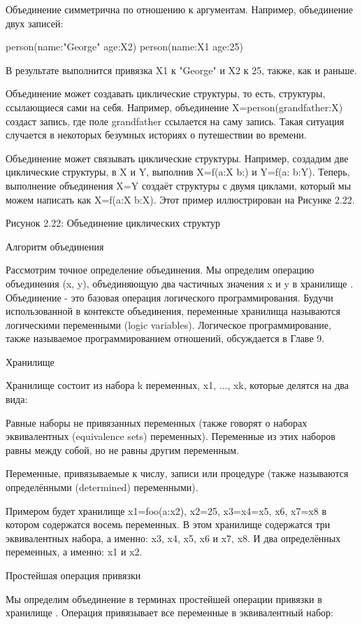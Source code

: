 Объединение симметрична по отношению к аргументам. Например, объединение двух записей:

person(name:"George" age:X2)
person(name:X1 age:25)

В результате выполнится привязка X1 к "George" и X2 к 25, также, как и раньше.

Объединение может создавать циклические структуры, то есть, структуры, ссылающиеся сами на себя. Например, объединение X=person(grandfather:X) создаст запись, где поле grandfather ссылается на саму запись. Такая ситуация случается в некоторых безумных историях о путешествии во времени.

Объединение может связывать циклические структуры. Например, создадим две циклические структуры, в X и Y, выполнив X=f(a:X b:) и Y=f(a: b:Y). Теперь, выполнение объединения X=Y создаёт структуры с двумя циклами, который мы можем написать как X=f(a:X b:X). Этот пример иллюстрирован на Рисунке 2.22.

Рисунок 2.22: Объединение циклических структур

Алгоритм объединения

Рассмотрим точное определение объединения. Мы определим операцию объединения (x, y), объединяющую два частичных значения x и y в хранилище . Объединение - это базовая операция логического программирования. Будучи использованной в контексте объединения, переменные хранилища называются логическими переменными (logic variables). Логическое программирование, также называемое программированием отношений, обсуждается в Главе 9.

Хранилище

Хранилище состоит из набора k переменных, x1, ..., xk, которые делятся на два вида:

Равные наборы не привязанных переменных (также говорят о наборах эквивалентных (equivalence sets) переменных). Переменные из этих наборов равны между собой, но не равны другим переменным.

Переменные, привязываемые к числу, записи или процедуре (также называются определёнными (determined) переменными).

Примером будет хранилище {x1=foo(a:x2), x2=25, x3=x4=x5, x6, x7=x8} в котором содержатся восемь переменных. В этом хранилище содержатся три эквивалентных набора, а именно: {x3, x4, x5}, {x6} и {x7, x8}. И два определённых переменных, а именно: x1 и x2.

Простейшая операция привязки

Мы определим объединение в терминах простейшей операции привязки в хранилище . Операция привязывает все переменные в эквивалентный набор:

